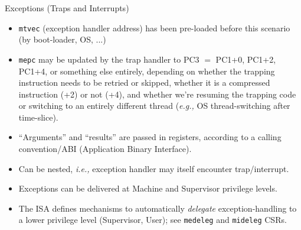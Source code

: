 \documentclass{article}
\newcommand{\ie}{\emph{i.e.,}}
\newcommand{\eg}{\emph{e.g.,}}
\begin{document}
\begin{center}
  {\Huge
    Exceptions (Traps and Interrupts)}

  \vspace*{0.2in}


  \vspace*{0.2in}

  \begin{minipage}{10.5in}\Large

    \begin{itemize}
    \item {\tt mtvec} (exception handler address) has been pre-loaded
      before this scenario (by boot-loader, OS, ...)

    \item {\tt mepc} may be updated by the trap handler to PC3 $=$
      PC1+0, PC1+2, PC1+4, or something else entirely, depending on
      whether the trapping instruction needs to be retried or skipped,
      whether it is a compressed instruction (+2) or not (+4), and
      whether we're resuming the trapping code or switching to an
      entirely different thread ({\eg} OS thread-switching after
      time-slice).

    \item ``Arguments'' and ``results'' are passed in registers,
      according to a calling convention/ABI (Application Binary
      Interface).

    \item Can be nested, {\ie} exception handler may itself encounter trap/interrupt.

    \item Exceptions can be delivered at Machine and Supervisor privilege levels.

    \item The ISA defines mechanisms to automatically \emph{delegate}
      exception-handling to a lower privilege level (Supervisor, User);
      see {\tt medeleg} and {\tt mideleg} CSRs.
    \end{itemize}
  \end{minipage}

\end{center}
\end{document}
